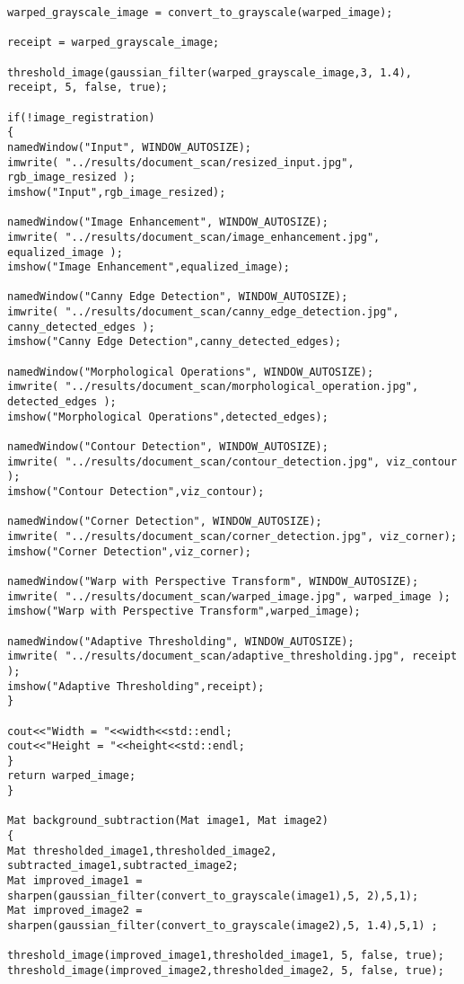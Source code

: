 \begin{lstlisting}
warped_grayscale_image = convert_to_grayscale(warped_image);

receipt = warped_grayscale_image;

threshold_image(gaussian_filter(warped_grayscale_image,3, 1.4), receipt, 5, false, true);

if(!image_registration)
{
namedWindow("Input", WINDOW_AUTOSIZE);
imwrite( "../results/document_scan/resized_input.jpg", rgb_image_resized );
imshow("Input",rgb_image_resized);

namedWindow("Image Enhancement", WINDOW_AUTOSIZE);
imwrite( "../results/document_scan/image_enhancement.jpg", equalized_image );
imshow("Image Enhancement",equalized_image);  

namedWindow("Canny Edge Detection", WINDOW_AUTOSIZE);
imwrite( "../results/document_scan/canny_edge_detection.jpg", canny_detected_edges );
imshow("Canny Edge Detection",canny_detected_edges);  

namedWindow("Morphological Operations", WINDOW_AUTOSIZE);
imwrite( "../results/document_scan/morphological_operation.jpg", detected_edges );
imshow("Morphological Operations",detected_edges);  

namedWindow("Contour Detection", WINDOW_AUTOSIZE);
imwrite( "../results/document_scan/contour_detection.jpg", viz_contour );
imshow("Contour Detection",viz_contour);

namedWindow("Corner Detection", WINDOW_AUTOSIZE);
imwrite( "../results/document_scan/corner_detection.jpg", viz_corner);
imshow("Corner Detection",viz_corner);

namedWindow("Warp with Perspective Transform", WINDOW_AUTOSIZE);
imwrite( "../results/document_scan/warped_image.jpg", warped_image );
imshow("Warp with Perspective Transform",warped_image);	  

namedWindow("Adaptive Thresholding", WINDOW_AUTOSIZE);
imwrite( "../results/document_scan/adaptive_thresholding.jpg", receipt );
imshow("Adaptive Thresholding",receipt);
}

cout<<"Width = "<<width<<std::endl;
cout<<"Height = "<<height<<std::endl;
}
return warped_image;
}

Mat background_subtraction(Mat image1, Mat image2)
{
Mat thresholded_image1,thresholded_image2, subtracted_image1,subtracted_image2;
Mat improved_image1 = sharpen(gaussian_filter(convert_to_grayscale(image1),5, 2),5,1);
Mat improved_image2 = sharpen(gaussian_filter(convert_to_grayscale(image2),5, 1.4),5,1) ;

threshold_image(improved_image1,thresholded_image1, 5, false, true);
threshold_image(improved_image2,thresholded_image2, 5, false, true);


\end{lstlisting}
